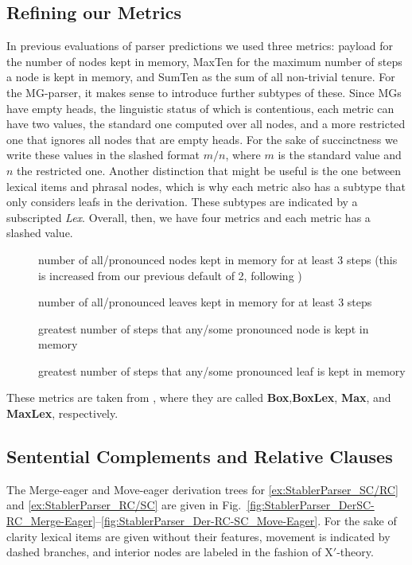 \subsection{Refining our Metrics}
In previous evaluations of parser predictions we used three metrics: payload for the number of nodes kept in memory, MaxTen for the maximum number of steps a node is kept in memory, and SumTen as the sum of all non-trivial tenure.
For the MG-parser, it makes sense to introduce further subtypes of these.
Since MGs have empty heads, the linguistic status of which is contentious, each metric can have two values, the standard one computed over all nodes, and a more restricted one that ignores all nodes that are empty heads.
For the sake of succinctness we write these values in the slashed format $m/n$, where $m$ is the standard value and $n$ the restricted one.
Another distinction that might be useful is the one between lexical items and phrasal nodes, which is why each metric also has a subtype that only considers leafs in the derivation.
These subtypes are indicated by a subscripted \emph{Lex}.
Overall, then, we have four metrics and each metric has a slashed value.
%
\begin{description}
    \item[\BoxTen] number of all\slash pronounced nodes kept in memory for at least 3 steps (this is increased from our previous default of 2, following \citealt{GrafMarcinek14CMCL})
    \item[\BoxLex] number of all\slash pronounced leaves kept in memory for at least 3 steps
    \item[\MaxTen] greatest number of steps that any\slash some pronounced node is kept in memory
    \item[\MaxLex] greatest number of steps that any\slash some pronounced leaf is kept in memory
\end{description}
%
These metrics are taken from \citet{GrafMarcinek14CMCL}, where they are called \textbf{Box},\textbf{BoxLex}, \textbf{Max}, and \textbf{MaxLex}, respectively.

\subsection{Sentential Complements and Relative Clauses}
The Merge-eager and Move-eager derivation trees for \eqref{ex:StablerParser_SC/RC} and \eqref{ex:StablerParser_RC/SC} are given in Fig.~\ref{fig:StablerParser_DerSC-RC_Merge-Eager}--\ref{fig:StablerParser_Der-RC-SC_Move-Eager}.
For the sake of clarity lexical items are given without their features, movement is indicated by dashed branches, and interior nodes are labeled in the fashion of X$'$-theory.

